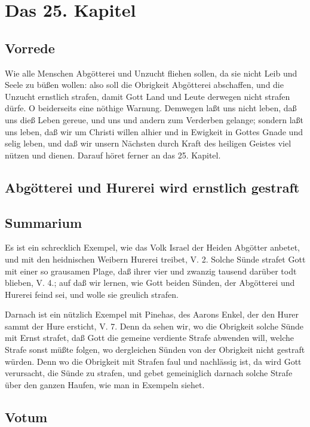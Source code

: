 \chapter{Das 25. Kapitel}

\section{Vorrede}

Wie alle Menschen Abgötterei und Unzucht fliehen sollen, da sie nicht Leib und Seele zu büßen wollen: also soll die Obrigkeit Abgötterei abschaffen, und die Unzucht ernstlich strafen, damit Gott Land und Leute derwegen nicht strafen dürfe. O beiderseits eine nöthige Warnung. Demwegen laßt uns nicht leben, daß uns dieß Leben gereue, und uns und andern zum Verderben gelange; sondern laßt uns leben, daß wir um Christi willen alhier und in Ewigkeit in Gottes Gnade und selig leben, und daß wir unsern Nächsten durch Kraft des heiligen Geistes viel nützen und dienen. Darauf höret ferner an das 25. Kapitel.

\section{Abgötterei und Hurerei wird ernstlich gestraft}

\section{Summarium}

Es ist ein schrecklich Exempel, wie das Volk Israel der Heiden Abgötter anbetet, und mit den heidnischen Weibern Hurerei treibet, V. 2. Solche Sünde strafet Gott mit einer so grausamen Plage, daß ihrer vier und zwanzig tausend darüber todt blieben, V. 4.; auf daß wir lernen, wie Gott beiden Sünden, der Abgötterei und Hurerei feind sei, und wolle sie greulich strafen.

Darnach ist ein nützlich Exempel mit Pinehas, des Aarons Enkel, der den Hurer sammt der Hure ersticht, V. 7. Denn da sehen wir, wo die Obrigkeit solche Sünde mit Ernst strafet, daß Gott die gemeine verdiente Strafe abwenden will, welche Strafe sonst müßte folgen, wo dergleichen Sünden von der Obrigkeit nicht gestraft würden. Denn wo die Obrigkeit mit Strafen faul und nachlässig ist, da wird Gott verursacht, die Sünde zu strafen, und gebet gemeiniglich darnach solche Strafe über den ganzen Haufen, wie man in Exempeln siehet.

\section{Votum}

